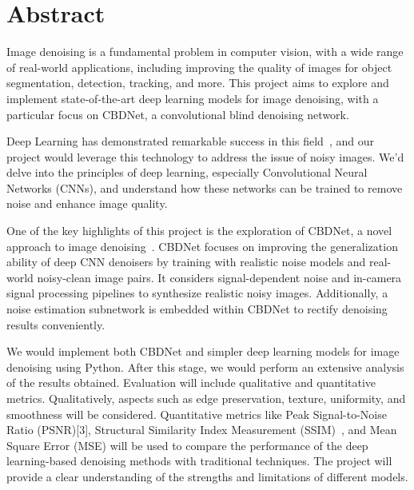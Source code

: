 
\section{Abstract}\label{sec:abstract}

    Image denoising is a fundamental problem in computer vision, with a wide range of real-world applications,
    including improving the quality of images for object segmentation, detection, tracking, and more.
    This project aims to explore and implement state-of-the-art deep learning models for image denoising,
    with a particular focus on CBDNet, a convolutional blind denoising network.

    Deep Learning has demonstrated remarkable success in this field~\cite{9057895},
    and our project would leverage this technology to address the issue of noisy images.
    We’d delve into the principles of deep learning, especially Convolutional Neural Networks (CNNs),
    and understand how these networks can be trained to remove noise and enhance image quality.

    One of the key highlights of this project is the exploration of CBDNet, a novel approach to image denoising~\cite{guo2019convolutional}.
    CBDNet focuses on improving the generalization ability of deep CNN denoisers by training with realistic noise models and real-world noisy-clean image pairs.
    It considers signal-dependent noise and in-camera signal processing pipelines to synthesize realistic noisy images.
    Additionally, a noise estimation subnetwork is embedded within CBDNet to rectify denoising results conveniently.

    We would implement both CBDNet and simpler deep learning models for image denoising using Python.
    After this stage, we would perform an extensive analysis of the results obtained.
    Evaluation will include qualitative and quantitative metrics.
    Qualitatively, aspects such as edge preservation, texture, uniformity, and smoothness will be considered.
    Quantitative metrics like Peak Signal-to-Noise Ratio (PSNR)[3], Structural Similarity Index Measurement (SSIM)~\cite{1284395},
    and Mean Square Error (MSE) will be used to compare the performance of the deep learning-based denoising methods with traditional techniques.
    The project will provide a clear understanding of the strengths and limitations of different models.
